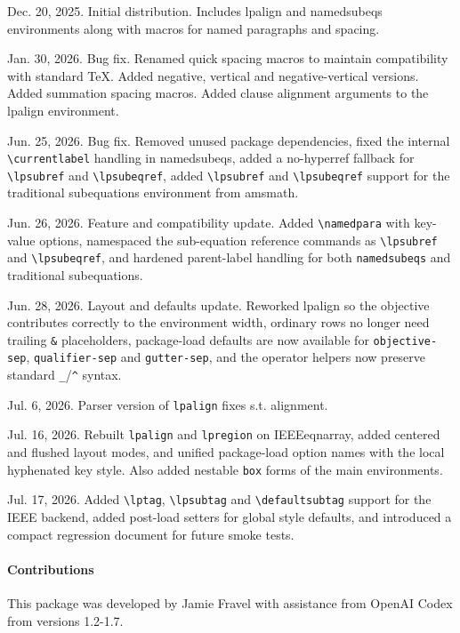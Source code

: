 \documentclass{article}
\begin{document}
	\begin{compactitem}
	\item[v1.0] Dec. 20, 2025. Initial distribution. Includes \textsf{lpalign} and \textsf{namedsubeqs} environments along with macros for named paragraphs and spacing.
	\item[v1.1] Jan. 30, 2026. Bug fix. Renamed quick spacing macros to maintain compatibility with standard \TeX. Added negative, vertical and negative-vertical versions. Added summation spacing macros. Added clause alignment arguments to the \textsf{lpalign} environment.
	\item[v1.2] Jun. 25, 2026. Bug fix. Removed unused package dependencies, fixed the internal \verb|\currentlabel| handling in \textsf{namedsubeqs}, added a no-\textsf{hyperref} fallback for \verb|\lpsubref| and \verb|\lpsubeqref|, added \verb|\lpsubref| and \verb|\lpsubeqref| support for the traditional \textsf{subequations} environment from \textsf{amsmath}.
	\item[v1.3] Jun. 26, 2026. Feature and compatibility update. Added \verb|\namedpara| with key-value options, namespaced the sub-equation reference commands as \verb|\lpsubref| and \verb|\lpsubeqref|, and hardened parent-label handling for both \verb|namedsubeqs| and traditional \textsf{subequations}.
	\item[v1.4] Jun. 28, 2026. Layout and defaults update. Reworked \textsf{lpalign} so the objective contributes correctly to the environment width, ordinary rows no longer need trailing \verb|&| placeholders, package-load defaults are now available for \verb|objective-sep|, \verb|qualifier-sep| and \verb|gutter-sep|, and the operator helpers now preserve standard \verb|_|/\verb|^| syntax.
	\item[v1.5] Jul. 6, 2026. Parser version of \verb|lpalign| fixes s.t. alignment.
	\item[v1.6] Jul. 16, 2026. Rebuilt \verb|lpalign| and \verb|lpregion| on \textsf{IEEEeqnarray}, added centered and flushed layout modes, and unified package-load option names with the local hyphenated key style. Also added nestable \verb|box| forms of the main environments.
	\item[v1.7] Jul. 17, 2026. Added \verb|\lptag|, \verb|\lpsubtag| and \verb|\defaultsubtag| support for the IEEE backend, added post-load setters for global style defaults, and introduced a compact regression document for future smoke tests.
	\end{compactitem}



\paragraph{Contributions} This package was developed by Jamie Fravel with assistance from OpenAI Codex from versions 1.2-1.7.
\end{document}
